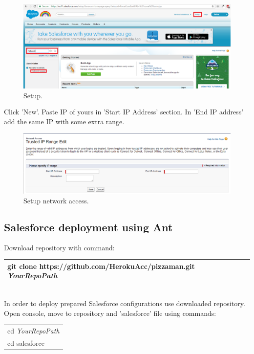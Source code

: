 \documentclass[12pt,a4paper]{article}
\begin{document}
\begin{figure}[H]
	\centering
	\includegraphics[width = 1 \textwidth]{images/network.PNG}
	\caption{Setup.}
	\label{fig:setup}
\end{figure}

Click 'New'. Paste IP of yours in 'Start IP Address' section. In 'End IP address' add the same IP with some extra range.

\begin{figure}[H]
	\centering
	\includegraphics[width = 1 \textwidth]{images/network2.PNG}
	\caption{Setup network access.}
	\label{fig:setupp}
\end{figure}

\subsection{Salesforce deployment using Ant}
Download repository with command:\\
\begin{tabular}{|l|}
	\hline
	git clone https://github.com/HerokuAcc/pizzaman.git \textit{YourRepoPath}\\
	\hline
\end{tabular}\\

In order to deploy prepared Salesforce configurations use downloaded repository. Open console, move to repository and 'salesforce' file using commands:\\

\begin{tabular}{|l|}
	\hline
	cd \textit{YourRepoPath}\\
	cd salesforce\\
	\hline
\end{tabular}\\
\end{document}
